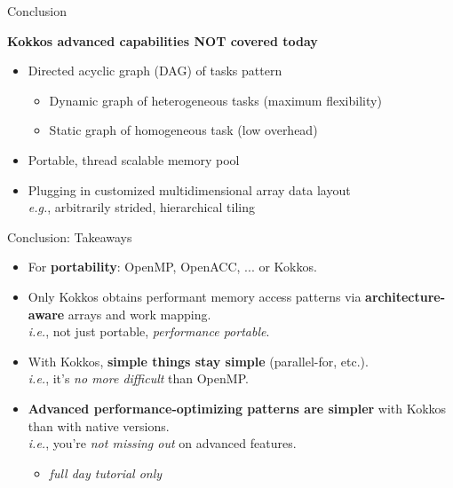 \begin{frame}{Conclusion}

  \textbf{Kokkos advanced capabilities NOT covered today}

  \begin{itemize}
  \item  Directed acyclic graph (DAG) of tasks pattern
    \begin{itemize}
    \item Dynamic graph of heterogeneous tasks (maximum flexibility)
    \item Static graph of homogeneous task (low overhead)
    \end{itemize}
  \item  Portable, thread scalable memory pool
  \item  Plugging in customized multidimensional array data layout
    \\ \hspace{10pt} \textit{e.g.}, arbitrarily strided, hierarchical tiling
  \end{itemize}

\end{frame}

\begin{frame}{Conclusion: Takeaways}

  \begin{itemize}
  \item {For \textbf{portability}: OpenMP, OpenACC, ... or Kokkos.}
  \item {Only Kokkos obtains performant memory access patterns via \textbf{architecture-aware} arrays and work mapping.
    \\ \hspace{10pt} \emph{i.e.}, not just portable, \emph{performance portable}.}
  \item {With Kokkos, \textbf{simple things stay simple} (parallel-for, etc.).
    \\ \hspace{10pt} \emph{i.e.}, it's \emph{no more difficult} than OpenMP.}
  \item {\textbf{Advanced performance-optimizing patterns are simpler} with Kokkos than with native versions. \\
         \hspace{10pt} \emph{i.e.}, you're \emph{not missing out} on advanced features.}
    \begin{itemize}
    \item {\textit{full day tutorial only}}
    \end{itemize}
  \end{itemize}

\end{frame}

